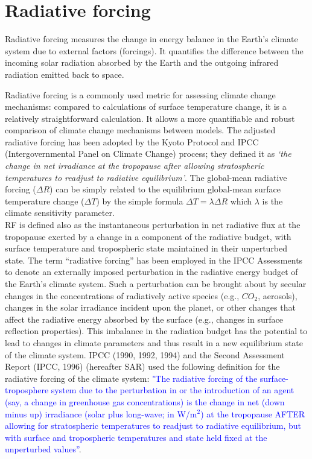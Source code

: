 \section{Radiative forcing}
Radiative forcing measures the change in energy balance in the Earth's climate system due to external factors (forcings). It quantifies the difference between the incoming solar radiation absorbed by the Earth and the outgoing infrared radiation emitted back to space.


Radiative forcing is a commonly used metric for assessing climate change mechanisms: compared to calculations of surface temperature change, it is a relatively straightforward calculation. It allows a more quantifiable and robust comparison of climate change mechanisms between models. The adjusted radiative forcing has been adopted by the Kyoto Protocol and IPCC (Intergovernmental Panel on Climate Change) process; they defined it as \textit{‘the change in net irradiance at the tropopause after allowing stratospheric temperatures to readjust to radiative equilibrium’}. The global-mean radiative forcing ($\Delta R$) can be simply related to the equilibrium global-mean surface temperature change ($\Delta T$) by the simple formula $\Delta T=\lambda\Delta R$ which $\lambda$ is the climate sensitivity parameter.\\


RF is defined also as the instantaneous perturbation in net radiative flux at the tropopause exerted by a change in a component of the radiative budget,
with surface temperature and tropospheric state maintained in their
unperturbed state. The term “radiative forcing” has been employed in the IPCC Assessments to denote an externally imposed perturbation in the radiative energy budget of the Earth’s climate system.
Such a perturbation can be brought about by secular changes in the
concentrations of radiatively active species (e.g., $CO_2$, aerosols), changes in the solar irradiance incident upon the planet, or other changes that affect the radiative energy absorbed by the surface (e.g., changes in surface reflection properties).
This imbalance in the radiation budget has the potential to lead to changes in climate parameters and thus result in a new equilibrium state of the climate system. IPCC (1990, 1992, 1994) and the Second Assessment Report (IPCC, 1996)
(hereafter SAR) used the following definition for the radiative forcing of the climate system:
\textcolor{Blue}{"The radiative forcing of the surface-troposphere system due to the
	perturbation in or the introduction of an agent (say, a change in greenhouse gas concentrations) is the change in net (down minus up) irradiance (solar plus long-wave; in W/m$^2$) at the tropopause AFTER allowing for stratospheric temperatures to readjust to radiative equilibrium, but with surface and tropospheric temperatures and state held fixed at the unperturbed values”}.\\


